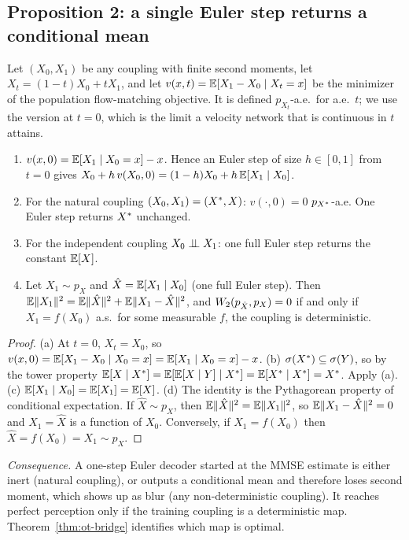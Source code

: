 \subsection{Proposition 2: a single Euler step returns a conditional mean}

Let $(X_0,X_1)$ be any coupling with finite second moments, let $X_t=(1-t)X_0+tX_1$, and let $v(x,t)=\mathbb{E}[X_1-X_0\mid X_t=x]$ be the minimizer of the population flow-matching objective. It is defined $p_{X_t}$-a.e.\ for a.e.\ $t$; we use the version at $t=0$, which is the limit a velocity network that is continuous in $t$ attains.

\begin{proposition}\label{prop:euler}
\leavevmode
\begin{enumerate}
  \item[(a)] $v(x,0)=\mathbb{E}[X_1\mid X_0=x]-x$. Hence an Euler step of size $h\in[0,1]$ from $t=0$ gives $X_0+h\,v(X_0,0)=(1-h)X_0+h\,\mathbb{E}[X_1\mid X_0]$.
  \item[(b)] For the natural coupling $(X_0,X_1)=(X^{*},X)$: $v(\cdot,0)=0$ $p_{X^{*}}$-a.e. One Euler step returns $X^{*}$ unchanged.
  \item[(c)] For the independent coupling $X_0\perp\!\!\!\perp X_1$: one full Euler step returns the constant $\mathbb{E}[X]$.
  \item[(d)] Let $X_1\sim p_X$ and $\hat X=\mathbb{E}[X_1\mid X_0]$ (one full Euler step). Then $\mathbb{E}\|X_1\|^2=\mathbb{E}\|\hat X\|^2+\mathbb{E}\|X_1-\hat X\|^2$, and $W_2(p_{\hat X},p_X)=0$ if and only if $X_1=f(X_0)$ a.s.\ for some measurable $f$, \ie the coupling is deterministic.
\end{enumerate}
\end{proposition}

\begin{proof}
(a) At $t=0$, $X_t=X_0$, so $v(x,0)=\mathbb{E}[X_1-X_0\mid X_0=x]=\mathbb{E}[X_1\mid X_0=x]-x$.
(b) $\sigma(X^{*})\subseteq\sigma(Y)$, so by the tower property $\mathbb{E}[X\mid X^{*}]=\mathbb{E}[\mathbb{E}[X\mid Y]\mid X^{*}]=\mathbb{E}[X^{*}\mid X^{*}]=X^{*}$. Apply (a).
(c) $\mathbb{E}[X_1\mid X_0]=\mathbb{E}[X_1]=\mathbb{E}[X]$.
(d) The identity is the Pythagorean property of conditional expectation. If $\hat X\sim p_X$, then $\mathbb{E}\|\hat X\|^2=\mathbb{E}\|X_1\|^2$, so $\mathbb{E}\|X_1-\hat X\|^2=0$ and $X_1=\hat X$ is a function of $X_0$. Conversely, if $X_1=f(X_0)$ then $\hat X=f(X_0)=X_1\sim p_X$.
\end{proof}

\noindent\emph{Consequence.} A one-step Euler decoder started at the MMSE estimate is either inert (natural coupling), or outputs a conditional mean and therefore loses second moment, which shows up as blur (any non-deterministic coupling). It reaches perfect perception only if the training coupling is a deterministic map. Theorem~\ref{thm:ot-bridge} identifies which map is optimal.

